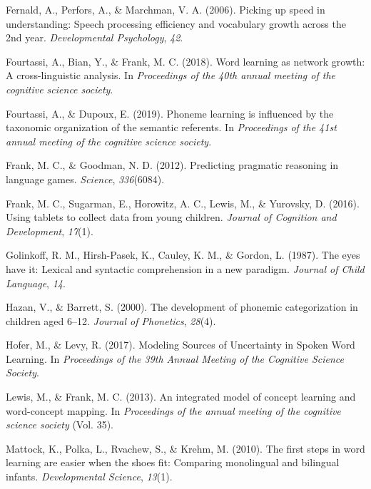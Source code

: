\documentclass[english,,man]{apa6}
\begin{document}
\leavevmode\hypertarget{ref-fernald2006}{}%
Fernald, A., Perfors, A., \& Marchman, V. A. (2006). Picking up speed in understanding: Speech processing efficiency and vocabulary growth across the 2nd year. \emph{Developmental Psychology}, \emph{42}.

\leavevmode\hypertarget{ref-fourtassi2018}{}%
Fourtassi, A., Bian, Y., \& Frank, M. C. (2018). Word learning as network growth: A cross-linguistic analysis. In \emph{Proceedings of the 40th annual meeting of the cognitive science society}.

\leavevmode\hypertarget{ref-fourtassi2019}{}%
Fourtassi, A., \& Dupoux, E. (2019). Phoneme learning is influenced by the taxonomic organization of the semantic referents. In \emph{Proceedings of the 41st annual meeting of the cognitive science society}.

\leavevmode\hypertarget{ref-frank2012}{}%
Frank, M. C., \& Goodman, N. D. (2012). Predicting pragmatic reasoning in language games. \emph{Science}, \emph{336}(6084).

\leavevmode\hypertarget{ref-frank2016}{}%
Frank, M. C., Sugarman, E., Horowitz, A. C., Lewis, M., \& Yurovsky, D. (2016). Using tablets to collect data from young children. \emph{Journal of Cognition and Development}, \emph{17}(1).

\leavevmode\hypertarget{ref-golinkoff1987}{}%
Golinkoff, R. M., Hirsh-Pasek, K., Cauley, K. M., \& Gordon, L. (1987). The eyes have it: Lexical and syntactic comprehension in a new paradigm. \emph{Journal of Child Language}, \emph{14}.

\leavevmode\hypertarget{ref-hazan2000}{}%
Hazan, V., \& Barrett, S. (2000). The development of phonemic categorization in children aged 6--12. \emph{Journal of Phonetics}, \emph{28}(4).

\leavevmode\hypertarget{ref-hofer2017}{}%
Hofer, M., \& Levy, R. (2017). Modeling Sources of Uncertainty in Spoken Word Learning. In \emph{Proceedings of the 39th Annual Meeting of the Cognitive Science Society}.

\leavevmode\hypertarget{ref-lewis2013}{}%
Lewis, M., \& Frank, M. C. (2013). An integrated model of concept learning and word-concept mapping. In \emph{Proceedings of the annual meeting of the cognitive science society} (Vol. 35).

\leavevmode\hypertarget{ref-Mattock2010}{}%
Mattock, K., Polka, L., Rvachew, S., \& Krehm, M. (2010). The first steps in word learning are easier when the shoes fit: Comparing monolingual and bilingual infants. \emph{Developmental Science}, \emph{13}(1).
\end{document}
